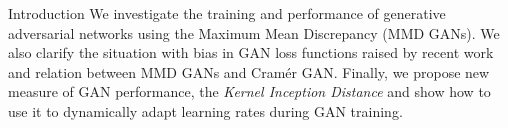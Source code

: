 \documentclass[xcolor={table}]{beamer}
\begin{document}
\begin{frame}{}
\maketitle
\begin{columns}[T, totalwidth=\textwidth]

  \begin{column}{.32\textwidth}
    \begin{block}{Introduction}
      We investigate the training and performance of generative adversarial networks 
      using the Maximum Mean Discrepancy (MMD GANs). We also clarify the situation with 
      bias in GAN loss functions raised by recent work and relation between MMD GANs and Cram\'er GAN.
      Finally, we propose new measure of GAN performance, the \emph{Kernel Inception Distance} and show
      how to use it to dynamically adapt learning rates during GAN training.
    \end{block}


\end{column}
\end{columns}
\end{frame}
\end{document}
